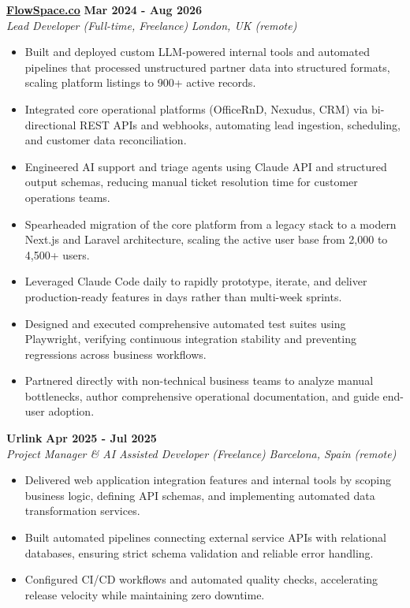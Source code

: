 \documentclass[10pt,a4paper]{article}
\newcommand{\role}[4]{%
  \textbf{#1} \hfill \textbf{#2}\\[1pt]%
  \textit{#3} \hfill \textit{#4}\\[2pt]%
}
\begin{document}
\role{\href{https://flowspace.co}{FlowSpace.co}}{Mar 2024 - Aug 2026}{Lead Developer (Full-time, Freelance)}{London, UK (remote)}
\begin{itemize}
  \item Built and deployed custom LLM-powered internal tools and automated pipelines that processed unstructured partner data into structured formats, scaling platform listings to 900+ active records.
  \item Integrated core operational platforms (OfficeRnD, Nexudus, CRM) via bi-directional REST APIs and webhooks, automating lead ingestion, scheduling, and customer data reconciliation.
  \item Engineered AI support and triage agents using Claude API and structured output schemas, reducing manual ticket resolution time for customer operations teams.
  \item Spearheaded migration of the core platform from a legacy stack to a modern Next.js and Laravel architecture, scaling the active user base from 2,000 to 4,500+ users.
  \item Leveraged Claude Code daily to rapidly prototype, iterate, and deliver production-ready features in days rather than multi-week sprints.
  \item Designed and executed comprehensive automated test suites using Playwright, verifying continuous integration stability and preventing regressions across business workflows.
  \item Partnered directly with non-technical business teams to analyze manual bottlenecks, author comprehensive operational documentation, and guide end-user adoption.
\end{itemize}

\role{Urlink}{Apr 2025 - Jul 2025}{Project Manager \& AI Assisted Developer (Freelance)}{Barcelona, Spain (remote)}
\begin{itemize}
  \item Delivered web application integration features and internal tools by scoping business logic, defining API schemas, and implementing automated data transformation services.
  \item Built automated pipelines connecting external service APIs with relational databases, ensuring strict schema validation and reliable error handling.
  \item Configured CI/CD workflows and automated quality checks, accelerating release velocity while maintaining zero downtime.
\end{itemize}
\end{document}

